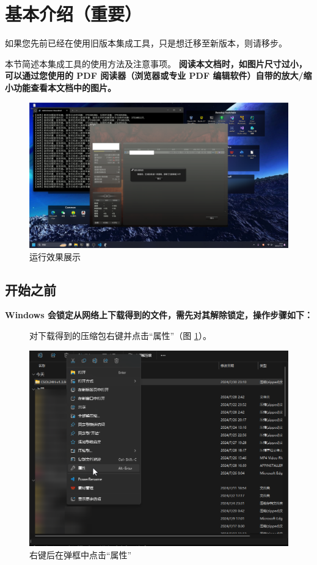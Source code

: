 \section{基本介绍（重要）}

如果您先前已经在使用旧版本集成工具，只是想迁移至新版本，则请移步。

本节简述本集成工具的使用方法及注意事项。\textbf{\color{red} 阅读本文档时，如图片尺寸过小，可以通过您使用的 PDF 阅读器（浏览器或专业 PDF 编辑软件）自带的放大/缩小功能查看本文档中的图片。}

\begin{figure}[H]
    \Centering
    \includegraphics[width=\textwidth]{assets/intro/controller.png}
    \caption{运行效果展示}
\end{figure}

\subsection{开始之前}

\textbf{\color{red}Windows 会锁定从网络上下载得到的文件，需先对其解除锁定，操作步骤如下：}

\begin{figure}[H]
    \Centering
    \parbox[l]{\textwidth}{对下载得到的压缩包右键并点击“属性”（图 \ref{ch0fig-unlock-0}）。}
    \includegraphics[width=\textwidth]{assets/intro/unlock_00.png}
    \caption{右键后在弹框中点击“属性”}
    \label{ch0fig-unlock-0}
\end{figure}

